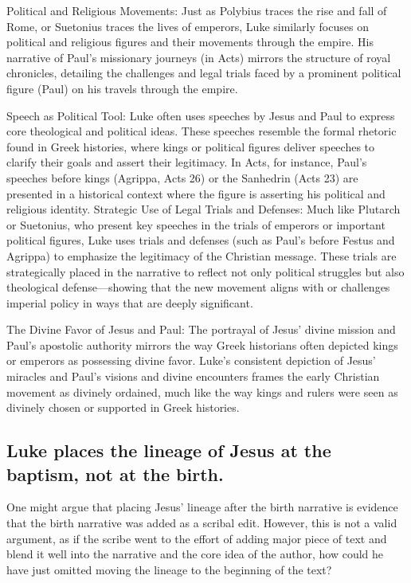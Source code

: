 Political and Religious Movements: Just as Polybius traces the rise and fall of Rome, or Suetonius traces the lives of emperors, Luke similarly focuses on political and religious figures and their movements through the empire.
His narrative of Paul's missionary journeys (in Acts) mirrors the structure of royal chronicles, detailing the challenges and legal trials faced by a prominent political figure (Paul) on his travels through the empire.

Speech as Political Tool: Luke often uses speeches by Jesus and Paul to express core theological and political ideas.
These speeches resemble the formal rhetoric found in Greek histories, where kings or political figures deliver speeches to clarify their goals and assert their legitimacy.
In Acts, for instance, Paul's speeches before kings (Agrippa, Acts 26) or the Sanhedrin (Acts 23) are presented in a historical context where the figure is asserting his political and religious identity.
Strategic Use of Legal Trials and Defenses: Much like Plutarch or Suetonius, who present key speeches in the trials of emperors or important political figures, Luke uses trials and defenses (such as Paul's before Festus and Agrippa) to emphasize the legitimacy of the Christian message.
These trials are strategically placed in the narrative to reflect not only political struggles but also theological defense---showing that the new movement aligns with or challenges imperial policy in ways that are deeply significant.

The Divine Favor of Jesus and Paul: The portrayal of Jesus' divine mission and Paul's apostolic authority mirrors the way Greek historians often depicted kings or emperors as possessing divine favor.
Luke's consistent depiction of Jesus' miracles and Paul's visions and divine encounters frames the early Christian movement as divinely ordained, much like the way kings and rulers were seen as divinely chosen or supported in Greek histories.

\subsection{Luke places the lineage of Jesus at the baptism, not at the birth.}\label{subsec:luke-places-the-lineage-of-jesus-at-the-baptism-not-at-the-birth.}

One might argue that placing Jesus' lineage after the birth narrative is evidence that the birth narrative was added as a scribal edit.
However, this is not a valid argument, as if the scribe went to the effort of adding major piece of text and blend it well into the narrative and the core idea of the author, how could he have just omitted moving the lineage to the beginning of the text?

